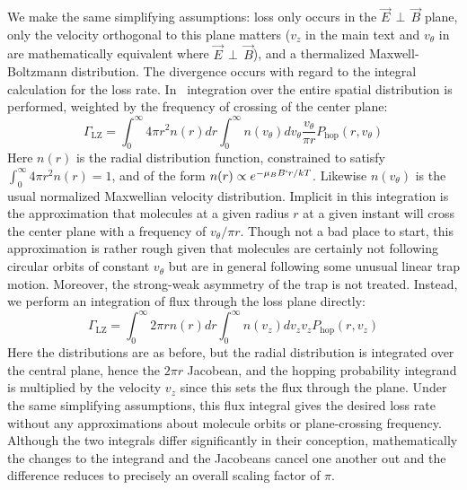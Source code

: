 \documentclass[%
 reprint,
 amsmath,amssymb,
 aps,
prl,
]{revtex4-1}
\newcommand{\epb}{{$\vec{E}\,{\perp}\,\vec{B}$}}
\begin{document}
We make the same simplifying assumptions: loss only occurs in the \epb{} plane, only the velocity orthogonal to this plane matters ($v_z$ in the main text and $v_\theta$ in~\cite{Stuhl2013} are mathematically equivalent where \epb{}), and a thermalized Maxwell-Boltzmann distribution.
The divergence occurs with regard to the integral calculation for the loss rate.
In~\cite{Stuhl2013} integration over the entire spatial distribution is performed, weighted by the frequency of crossing of the center plane:
\begin{equation}
\Gamma_\text{LZ}=\int_0^\infty4\pi r^2n(r)dr\int_0^\infty n(v_\theta)dv_\theta \frac{v_\theta}{\pi r} P_\text{hop}(r,v_\theta)
\end{equation}
Here $n(r)$ is the radial distribution function, constrained to satisfy $\int_0^\infty 4\pi r^2n(r)=1$, and of the form $n(r)\propto e^{-\mu_BB`r/kT}$. 
Likewise $n(v_\theta)$ is the usual normalized Maxwellian velocity distribution. 
Implicit in this integration is the approximation that molecules at a given radius $r$ at a given instant will cross the center plane with a frequency of $v_\theta/\pi r$.
Though not a bad place to start, this approximation is rather rough given that molecules are certainly not following circular orbits of constant $v_\theta$ but are in general following some unusual linear trap motion.
Moreover, the strong-weak asymmetry of the trap is not treated.
Instead, we perform an integration of flux through the loss plane directly:
\begin{equation}
\Gamma_\text{LZ}=\int_0^\infty2\pi r n(r)dr\int_0^\infty n(v_z)dv_z v_z P_\text{hop}(r,v_z)
\end{equation}
Here the distributions are as before, but the radial distribution is integrated over the central plane, hence the $2\pi r$ Jacobean, and the hopping probability integrand is multiplied by the velocity $v_z$ since this sets the flux through the plane.
Under the same simplifying assumptions, this flux integral gives the desired loss rate without any approximations about molecule orbits or plane-crossing frequency.
Although the two integrals differ significantly in their conception, mathematically the changes to the integrand and the Jacobeans cancel one another out and the difference reduces to precisely an overall scaling factor of $\pi$. 
\end{document}
